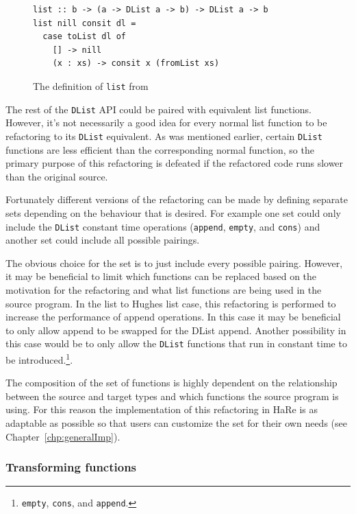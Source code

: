 \begin{figure}[t]
\begin{lstlisting}
list :: b -> (a -> DList a -> b) -> DList a -> b
list nill consit dl =
  case toList dl of
    [] -> nill
    (x : xs) -> consit x (fromList xs)
\end{lstlisting}
\caption{The definition of \texttt{list} from~\citep{dlist}}
\label{dListList}
\end{figure}

The rest of the \texttt{DList} API could be paired with equivalent list functions. However, it's not necessarily a good idea for every normal list function to be refactoring to its \texttt{DList} equivalent. As was mentioned earlier, certain \texttt{DList} functions are less efficient than the corresponding normal function, so the primary purpose of this refactoring is defeated if the refactored code runs slower than the original source.

Fortunately different versions of the refactoring can be made by defining separate sets depending on the behaviour that is desired. For example one set could only include the \texttt{DList} constant time operations (\texttt{append}, \texttt{empty}, and \texttt{cons}) and another set could include all possible pairings.

The obvious choice for the set is to just include every possible pairing. However, it may be beneficial to limit which functions can be replaced based on the motivation for the refactoring and what list functions are being used in the source program. In the list to Hughes list case, this refactoring is performed to increase the performance of append operations. In this case it may be beneficial to only allow append to be swapped for the DList append. Another possibility in this case would be to only allow the \texttt{DList} functions that run in constant time to be introduced.\footnote{\texttt{empty}, \texttt{cons}, and \texttt{append}.}. 

The composition of the set of functions is highly dependent on the relationship between the source and target types and which functions the source program is using. For this reason the implementation of this refactoring in HaRe is as adaptable as possible so that users can customize the set for their own needs (see Chapter~\ref{chp:generalImp}).

\subsubsection{Transforming functions}

